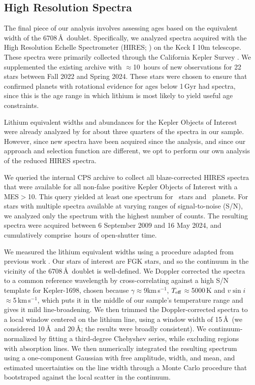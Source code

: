 \documentclass[11pt,twocolumn,tighten]{aastex63}
\newcommand{\kms}{{km\,s$^{-1}$}}
\begin{document}
\subsection{High Resolution Spectra}
\label{subsec:lithiumsel}

The final piece of our analysis involves assessing ages based on the
equivalent width of the  6708\,\AA\ doublet.  Specifically,
we analyzed spectra acquired with the High Resolution Echelle
Spectrometer (HIRES; \citealt{vogt_hires_1994}) on the Keck I 10m
telescope.  These spectra were primarily collected through the
California Kepler Survey
\citep{2017AJ....154..107P,2017AJ....154..108J,2017AJ....154..109F}.
We supplemented the existing archive with $\approx$10~hours of new
observations for 22 stars between Fall 2022 and Spring 2024.  These
stars were chosen to ensure that confirmed planets with rotational
evidence for ages below 1\,Gyr had spectra, since this is the age
range in which lithium is most likely to yield useful age constraints.

Lithium equivalent widths and abundances for the Kepler Objects of
Interest were already analyzed by \citet{2018ApJ...855..115B} for
about three quarters of the spectra in our sample.  However, since new
spectra have been acquired since the \citeauthor{2018ApJ...855..115B}
analysis, and since our approach and selection function are different,
we opt to perform our own analysis of the reduced HIRES spectra.

We queried the internal CPS archive to collect all blaze-corrected
HIRES spectra that were available for all non-false positive Kepler
Objects of Interest with a MES$>$10.  This query yielded at least one
spectrum for \nlithiumstars\ stars and \nlithiumplanets\ planets.  For
stars with multiple spectra available at varying ranges of
signal-to-noise (S/N), we analyzed only the spectrum with the highest
number of counts.  The resulting spectra were acquired between 6
September 2009 and 16 May 2024, and cumulatively comprise
\nhireshours\,hours of open-shutter time.

We measured the lithium equivalent widths using a procedure
adapted from previous work \citep{Bouma_2021}.  Our stars of interest
are FGK stars, and so the continuum in the vicinity of the 
6708\,\AA\ doublet is well-defined.  We Doppler corrected the spectra
to a common reference wavelength by cross-correlating against a high
S/N template for Kepler-1698, chosen because $\gamma$$\approx$9\kms,
$T_{\rm eff}$$\approx$5000\,K and $v\sin i$$\approx$5\,\kms, which
puts it in the middle of our sample's temperature range and gives it
mild line-broadening.  We then trimmed the Doppler-corrected spectra
to a local window centered on the lithium line, using a window width
of 15\,\AA\ (we considered 10\,\AA\ and 20\,\AA; the results were
broadly consistent).  We continuum-normalized by fitting a
third-degree Chebyshev series, while excluding regions with
absorption lines.  We then numerically integrated the resulting
spectrum using a one-component Gaussian with free amplitude, width,
and mean, and estimated uncertainties on the line width through a
Monte Carlo procedure that bootstraped against the local scatter in
the continuum.
\end{document}
